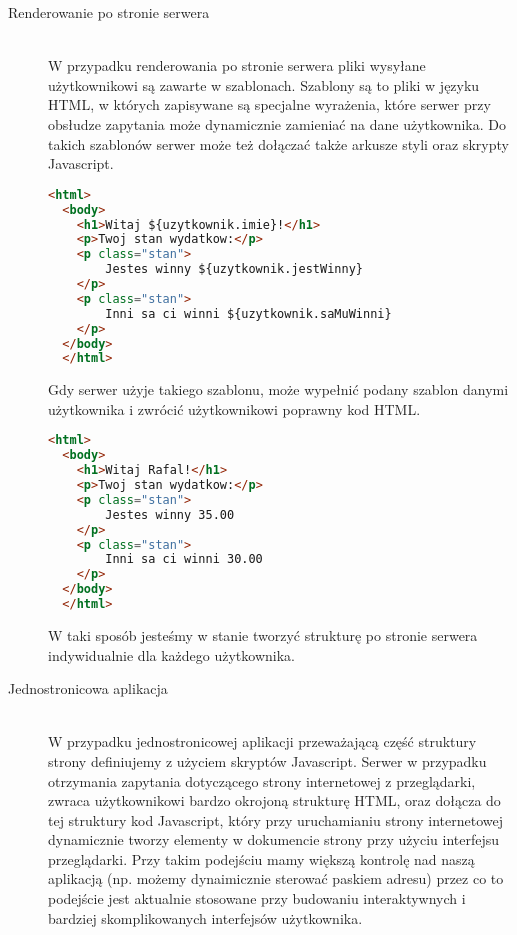 \begin{description}
  \item[Renderowanie po stronie serwera] \hfill \\ W przypadku renderowania po stronie serwera pliki wysyłane użytkownikowi są zawarte w szablonach. Szablony są to pliki w języku HTML, w których zapisywane są specjalne wyrażenia, które serwer przy obsłudze zapytania może dynamicznie zamieniać na dane użytkownika. Do takich szablonów serwer może też dołączać także arkusze styli oraz skrypty Javascript.
  \begin{lstlisting}[language=HTML, caption=Przykład szablonu w Freemaker]
  <html>
  <body>
    <h1>Witaj ${uzytkownik.imie}!</h1>
    <p>Twoj stan wydatkow:</p>
    <p class="stan">
        Jestes winny ${uzytkownik.jestWinny}
    </p>
    <p class="stan">
        Inni sa ci winni ${uzytkownik.saMuWinni}
    </p>
  </body>
  </html>
  \end{lstlisting}

  Gdy serwer użyje takiego szablonu, może wypełnić podany szablon danymi użytkownika i zwrócić użytkownikowi poprawny kod HTML.

  \begin{lstlisting}[language=HTML, caption=Przykład szablonu w Freemaker]
  <html>
  <body>
    <h1>Witaj Rafal!</h1>
    <p>Twoj stan wydatkow:</p>
    <p class="stan">
        Jestes winny 35.00
    </p>
    <p class="stan">
        Inni sa ci winni 30.00
    </p>
  </body>
  </html>
  \end{lstlisting}
  W taki sposób jesteśmy w stanie tworzyć strukturę po stronie serwera indywidualnie dla każdego użytkownika.

  \item[Jednostronicowa aplikacja] \hfill \\ W przypadku jednostronicowej aplikacji przeważającą część struktury strony definiujemy z użyciem skryptów Javascript. Serwer w przypadku otrzymania zapytania dotyczącego strony internetowej z przeglądarki, zwraca użytkownikowi bardzo okrojoną strukturę HTML, oraz dołącza do tej struktury kod Javascript, który przy uruchamianiu strony internetowej dynamicznie tworzy elementy w dokumencie strony przy użyciu interfejsu przeglądarki. Przy takim podejściu mamy większą kontrolę nad naszą aplikacją (np. możemy dynaimicznie sterować paskiem adresu) przez co to podejście jest aktualnie stosowane przy budowaniu interaktywnych i bardziej skomplikowanych interfejsów użytkownika.


\end{description}
